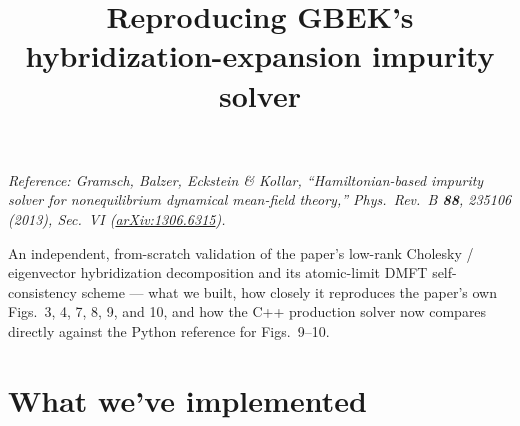 \documentclass[11pt]{article}
\title{\Large Reproducing GBEK's hybridization-expansion impurity solver}
\author{}
\date{}
\begin{document}
\maketitle
\vspace{-3.5em}

\begin{center}
\begin{minipage}{0.85\textwidth}
\small
\emph{Reference: Gramsch, Balzer, Eckstein \& Kollar, ``Hamiltonian-based
impurity solver for nonequilibrium dynamical mean-field theory,'' Phys.\
Rev.\ B \textbf{88}, 235106 (2013), Sec.\ VI
(\href{https://arxiv.org/abs/1306.6315}{arXiv:1306.6315}).}

\medskip
An independent, from-scratch validation of the paper's low-rank Cholesky /
eigenvector hybridization decomposition and its atomic-limit DMFT
self-consistency scheme --- what we built, how closely it reproduces the
paper's own Figs.\ 3, 4, 7, 8, 9, and 10, and how the C++ production solver
now compares directly against the Python reference for Figs.\ 9--10.
\end{minipage}
\end{center}

\vspace{1.5em}

\section*{What we've implemented}
\end{document}
